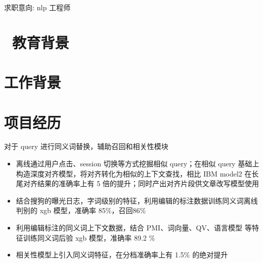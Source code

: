 \documentclass{resume}
\begin{document}

\centerline{求职意向: nlp 工程师}



\section{\faGraduationCap\  教育背景}

\section{\faGraduationCap  工作背景}

\section{\faUsers 项目经历}

\begin{onehalfspacing}
对于 query 进行同义词替换，辅助召回和相关性模块
\begin{itemize}
  \item 离线通过用户点击、session 切换等方式挖掘相似 query；在相似 query 基础上构造深度对齐模型，将对齐转化为相似的上下文查找，相比 IBM model2 在长尾对齐结果的准确率上有 5 倍的提升；同时产出对齐片段供文章改写模型使用
  \item 结合搜狗的曝光日志，字词级别的特征，利用编辑的标注数据训练同义词离线判别的 xgb 模型，准确率 85\%，召回86\%
  \item 利用编辑标注的同义词上下文数据，结合 PMI、词向量、QV、语言模型 等特征训练同义词后验 xgb 模型，准确率 89.2 \%
  \item 相关性模型上引入同义词特征，在分档准确率上有 1.5\% 的绝对提升
\end{itemize}
\end{onehalfspacing}
\end{document}
